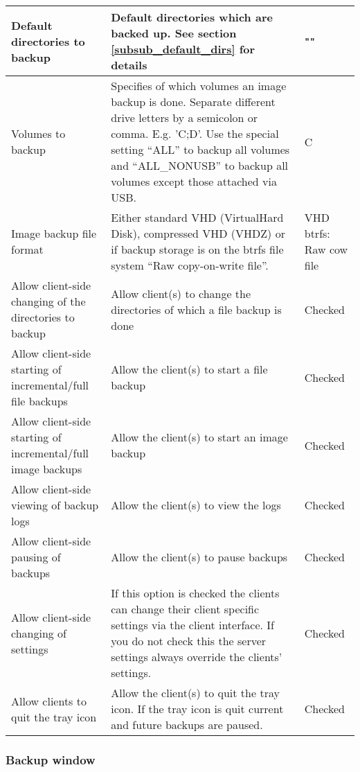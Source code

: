 \documentclass[a4paper,10pt]{article}
\begin{document}
\begin{longtable}{|p{}|p{}|p{}|}
\hline
Default directories to backup & Default directories which are backed up. See section \ref{subsub_default_dirs} for details & ""\\
\hline
Volumes to backup & Specifies of which volumes an image backup is done. Separate different drive letters by a semicolon or comma. E.g. 'C;D'. Use the special setting ``ALL'' to backup all volumes and ``ALL\_NONUSB'' to backup all volumes except those attached via USB. & C \\
\hline
Image backup file format & Either standard VHD (VirtualHard Disk), compressed VHD (VHDZ) or if backup storage is on the btrfs file system ``Raw copy-on-write file''. & VHD btrfs: Raw cow file\\
\hline
Allow client-side changing of the directories to backup & Allow client(s) to change the directories of which a file backup is done & Checked \\
\hline
Allow client-side starting of incremental/full file backups & Allow the client(s) to start a file backup & Checked \\
\hline
Allow client-side starting of incremental/full image backups & Allow the client(s) to start an image backup & Checked \\
\hline
Allow client-side viewing of backup logs & Allow the client(s) to view the logs & Checked \\
\hline
Allow client-side pausing of backups & Allow the client(s) to pause backups & Checked \\
\hline
Allow client-side changing of settings & If this option is checked the clients can change their client specific settings via the client interface. If you do not check this the server settings always override the clients' settings. & Checked\\
\hline
Allow clients to quit the tray icon & Allow the client(s) to quit the tray icon. If the tray icon is quit current and future backups are paused. & Checked \\
\hline
\end{longtable}

\subsubsection{Backup window}
\label{subsub_backup_window}
\end{document}
